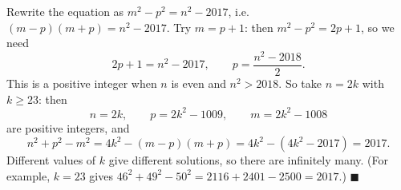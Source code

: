 Rewrite the equation as $m^2-p^2=n^2-2017$, i.e.\ $(m-p)(m+p)=n^2-2017$. Try $m=p+1$: then $m^2-p^2=2p+1$, so we need
\[
2p+1=n^2-2017,\qquad p=\dfrac{n^2-2018}{2}.
\]
This is a positive integer when $n$ is even and $n^2>2018$. So take $n=2k$ with $k\ge23$: then
\[
n=2k,\qquad p=2k^2-1009,\qquad m=2k^2-1008
\]
are positive integers, and
\[
n^2+p^2-m^2=4k^2-\left(m-p\right)\left(m+p\right)=4k^2-\left(4k^2-2017\right)=2017 .
\]
Different values of $k$ give different solutions, so there are infinitely many. (For example, $k=23$ gives $46^2+49^2-50^2=2116+2401-2500=2017$.) $\blacksquare$
